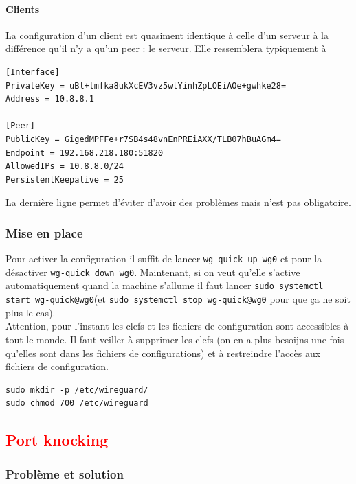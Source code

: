 \documentclass[a4paper, 12pt]{article}
\begin{document}
\paragraph{Clients}
La configuration d'un client est quasiment identique à celle d'un serveur à la différence qu'il n'y a qu'un peer : le serveur. Elle ressemblera typiquement à 

\begin{lstlisting}[language = shell]
[Interface]
PrivateKey = uBl+tmfka8ukXcEV3vz5wtYinhZpLOEiAOe+gwhke28=
Address = 10.8.8.1

[Peer]
PublicKey = GigedMPFFe+r7SB4s48vnEnPREiAXX/TLB07hBuAGm4= 
Endpoint = 192.168.218.180:51820
AllowedIPs = 10.8.8.0/24
PersistentKeepalive = 25
\end{lstlisting}
La dernière ligne permet d'éviter d'avoir des problèmes mais n'est pas obligatoire.
\subsubsection{Mise en place}
Pour activer la configuration il suffit de lancer \verb+wg-quick up wg0+ et pour la désactiver \verb+wg-quick down wg0+. Maintenant, si on veut qu'elle s'active automatiquement quand la machine s'allume il faut lancer \verb+sudo systemctl start wg-quick@wg0+(et \verb+sudo systemctl stop wg-quick@wg0+ pour que ça ne soit plus le cas). \\

Attention, pour l'instant les clefs et les fichiers de configuration sont accessibles à tout le monde. Il faut veiller à supprimer les clefs (on en a plus besoijns une fois qu'elles sont dans les fichiers de configurations) et à restreindre l'accès aux fichiers de configuration. 

\begin{center}
\begin{minipage}{.51\linewidth}
\begin{lstlisting}[language = shell]
sudo mkdir -p /etc/wireguard/
sudo chmod 700 /etc/wireguard
\end{lstlisting}
\end{minipage}
\end{center}

\subsection{\textcolor{red}{Port knocking}}
\subsubsection{Problème et solution}
\end{document}
